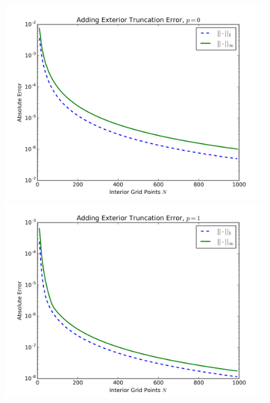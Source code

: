 \documentclass{article} %
\theoremstyle{plain}
\numberwithin{equation}{section} %
\numberwithin{figure}{section} %
\numberwithin{table}{section} %
\begin{document}
\begin{enumerate}[\ \ (a)]
\begin{figure}[ht!]
\begin{minipage}[b]{0.5\linewidth}
                \vspace{4ex}
            \end{minipage}%
            \begin{minipage}[b]{0.5\linewidth}
                \centering
                \includegraphics[width=\linewidth]{figure_2c1_ext_p=0.png}
                \vspace{4ex}
            \end{minipage} 
            \begin{minipage}[b]{0.5\linewidth}
                \centering
                \includegraphics[width=\linewidth]{figure_2c1_ext_p=1.png} 
                \vspace{4ex}
            \end{minipage}%

\end{figure}
\end{enumerate}
\end{document}
